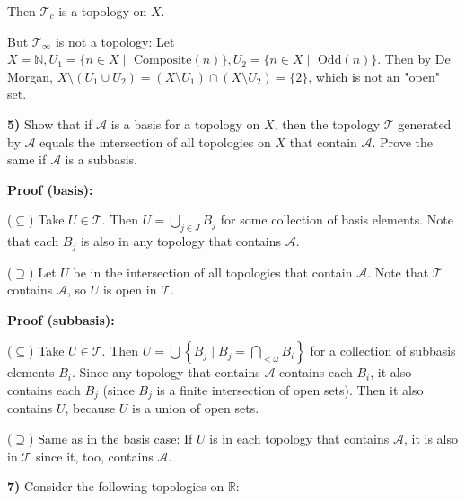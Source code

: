 \documentclass[paper=a4, fontsize=11pt]{scrartcl} %
\newcommand{\script}{\mathcal}
\numberwithin{equation}{section}    %
\numberwithin{figure}{section}      %
\numberwithin{table}{section}       %
\begin{document}
Then $\script T_c$ is a topology on $X$.

But $\script T_\infty$ is not a topology: Let $X = \mathbb N, U_1 = \{ n \in X
 \mid \text{ Composite}(n) \}, U_2 = \{ n \in X \mid \text{ Odd}(n) \}$. Then
by De Morgan, $X \setminus (U_1 \cup U_2) = (X \setminus U_1) \cap (X \setminus U_2)
 = \{2\}$, which is not an "open" set.

\hrulefill

\textbf {5)} Show that if $\script A$ is a basis for a topology on $X$, then the
topology $\script T$ generated by $\script A$ equals the intersection of all topologies on
$X$ that contain $\script A$. Prove the same if $\script A$ is a subbasis.

\textbf {Proof (basis):} 

($\subseteq$) Take $U \in \script T$. Then $U = \bigcup_{j \in J} B_j$ for some
collection of basis elements. Note that each $B_j$ is also in any topology that
contains $\script A$.

($\supseteq$) Let $U$ be in the intersection of all topologies that contain $\script A$.
Note that $\script T$ contains $\script A$, so $U$ is open in $\script T$.

\textbf {Proof (subbasis):} 

($\subseteq$) Take $U \in \script T$. Then $U = \bigcup \left\{ B_j \mid B_j = \bigcap_{<\omega} B_i \right\}$
for a collection of subbasis elements $B_i$. Since any topology that contains
$\script A$ contains each $B_i$, it also contains each $B_j$ (since $B_j$ is a
finite intersection of open sets). Then it also contains $U$, because $U$ is
a union of open sets.

($\supseteq$) Same as in the basis case: If $U$ is in each topology that contains
$\script A$, it is also in $\script T$ since it, too, contains $\script A$.

\hrulefill

\textbf {7)} Consider the following topologies on $\mathbb R$:
\end{document}
